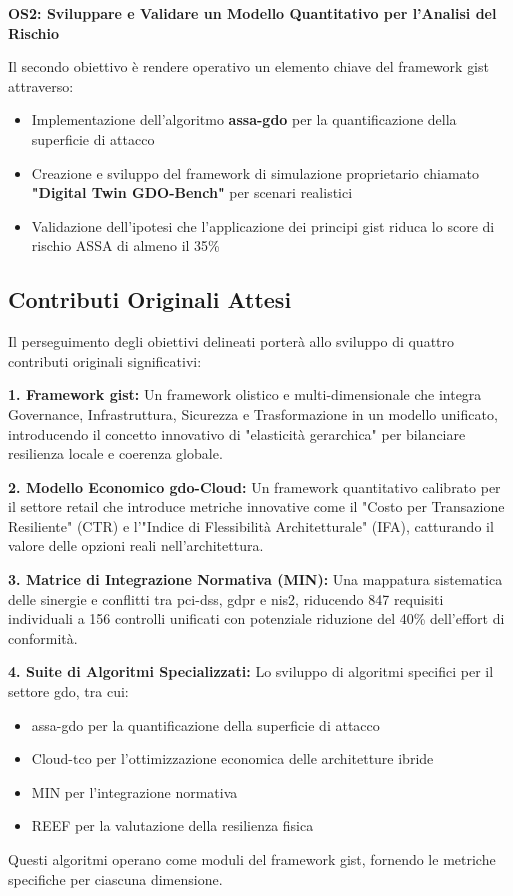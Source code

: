 \textbf{OS2: Sviluppare e Validare un Modello Quantitativo per l'Analisi del Rischio}

Il secondo obiettivo è rendere operativo un elemento chiave del framework \gls{gist} attraverso:
\begin{itemize}
\item Implementazione dell'algoritmo \textbf{\gls{assa-gdo}} per la quantificazione della superficie di attacco
\item Creazione e sviluppo del framework di simulazione proprietario chiamato \textbf{"Digital Twin GDO-Bench"} per scenari realistici
\item Validazione dell'ipotesi che l'applicazione dei principi \gls{gist} riduca lo score di rischio ASSA di almeno il 35\%
\end{itemize}

\subsection{\texorpdfstring{Contributi Originali Attesi}{1.3.3 - Contributi Originali Attesi}}
\label{subsec:contributi_originali}

Il perseguimento degli obiettivi delineati porterà allo sviluppo di quattro contributi originali significativi:

\textbf{1. Framework \gls{gist}:} Un framework olistico e multi-dimensionale che integra Governance, Infrastruttura, Sicurezza e Trasformazione in un modello unificato, introducendo il concetto innovativo di "elasticità gerarchica" per bilanciare resilienza locale e coerenza globale.

\textbf{2. Modello Economico \gls{gdo}-Cloud:} Un framework quantitativo calibrato per il settore retail che introduce metriche innovative come il "Costo per Transazione Resiliente" (CTR) e l'"Indice di Flessibilità Architetturale" (IFA), catturando il valore delle opzioni reali nell'architettura.

\textbf{3. Matrice di Integrazione Normativa (MIN):} Una mappatura sistematica delle sinergie e conflitti tra \gls{pci-dss}, \gls{gdpr} e \gls{nis2}, riducendo 847 requisiti individuali a 156 controlli unificati con potenziale riduzione del 40\% dell'effort di conformità.

\textbf{4. Suite di Algoritmi Specializzati:} Lo sviluppo di algoritmi specifici per il settore \gls{gdo}, tra cui:
\begin{itemize}
\item \gls{assa-gdo} per la quantificazione della superficie di attacco
\item Cloud-\gls{tco} per l'ottimizzazione economica delle architetture ibride
\item MIN per l'integrazione normativa
\item REEF per la valutazione della resilienza fisica
\end{itemize}
Questi algoritmi operano come moduli del framework \gls{gist}, fornendo le metriche specifiche per ciascuna dimensione.

